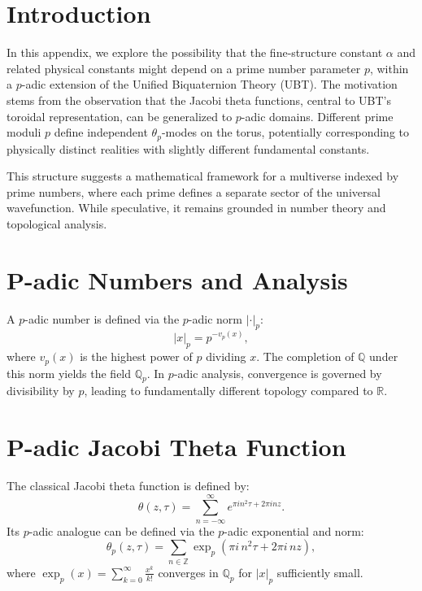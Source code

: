 

\section{Introduction}
In this appendix, we explore the possibility that the fine-structure constant $\alpha$ and related physical constants might depend on a prime number parameter $p$, within a $p$-adic extension of the Unified Biquaternion Theory (UBT).
The motivation stems from the observation that the Jacobi theta functions, central to UBT's toroidal representation, can be generalized to $p$-adic domains.
Different prime moduli $p$ define independent $\theta_p$-modes on the torus, potentially corresponding to physically distinct realities with slightly different fundamental constants.

This structure suggests a mathematical framework for a multiverse indexed by prime numbers, where each prime defines a separate sector of the universal wavefunction. While speculative, it remains grounded in number theory and topological analysis.

\section{P-adic Numbers and Analysis}
A $p$-adic number is defined via the $p$-adic norm $|\cdot|_p$:
\begin{equation}
|x|_p = p^{-v_p(x)},
\end{equation}
where $v_p(x)$ is the highest power of $p$ dividing $x$. The completion of $\mathbb{Q}$ under this norm yields the field $\mathbb{Q}_p$.
In $p$-adic analysis, convergence is governed by divisibility by $p$, leading to fundamentally different topology compared to $\mathbb{R}$.

\section{P-adic Jacobi Theta Function}
The classical Jacobi theta function is defined by:
\begin{equation}
\theta(z,\tau) = \sum_{n=-\infty}^\infty e^{\pi i n^2 \tau + 2\pi i n z}.
\end{equation}
Its $p$-adic analogue can be defined via the $p$-adic exponential and norm:
\begin{equation}
\theta_p(z,\tau) = \sum_{n \in \mathbb{Z}} \exp_p\!\left(\pi i\, n^2 \tau + 2\pi i\, n z \right),
\end{equation}
where $\exp_p(x) = \sum_{k=0}^\infty \frac{x^k}{k!}$ converges in $\mathbb{Q}_p$ for $|x|_p$ sufficiently small.


